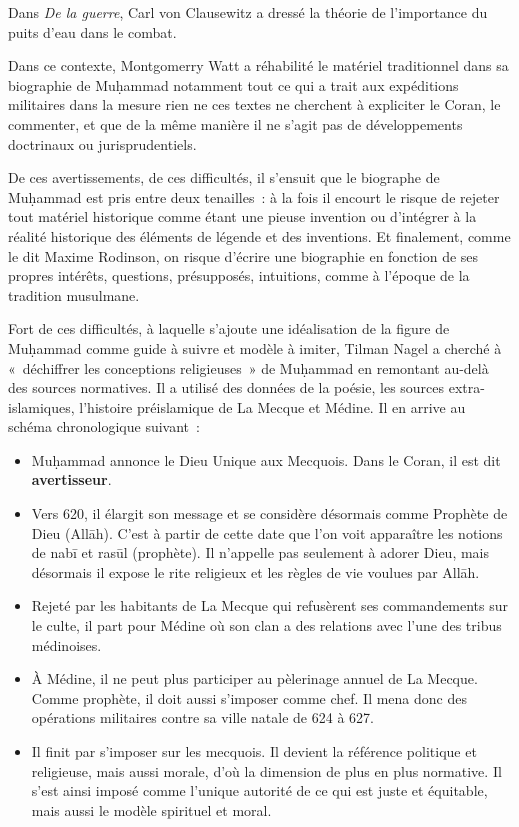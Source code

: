 Dans\textit{ De la guerre}, Carl von Clausewitz a dressé la théorie de
l'importance du puits d'eau dans le combat.

Dans ce contexte, Montgomerry Watt a réhabilité le matériel traditionnel
dans sa biographie de Muḥammad notamment tout ce qui a trait aux
expéditions militaires dans la mesure rien ne ces textes ne cherchent à
expliciter le Coran, le commenter, et que de la même manière il ne
s'agit pas de développements doctrinaux ou jurisprudentiels.

De ces avertissements, de ces difficultés, il s'ensuit que le biographe
de Muḥammad est pris entre deux tenailles~: à la fois il encourt le
risque de rejeter tout matériel historique comme étant une pieuse
invention ou d'intégrer à la réalité historique des éléments de légende
et des inventions. Et finalement, comme le dit Maxime Rodinson, on
risque d'écrire une biographie en fonction de ses propres intérêts,
questions, présupposés, intuitions, comme à l'époque de la tradition
musulmane.

Fort de ces difficultés, à laquelle s'ajoute une idéalisation de la
figure de Muḥammad comme guide à suivre et modèle à imiter, Tilman Nagel
a cherché à «~déchiffrer les conceptions religieuses~» de Muḥammad en
remontant au-delà des sources normatives. Il a utilisé des données de la
poésie, les sources extra-islamiques, l'histoire préislamique de La
Mecque et Médine. Il en arrive au schéma chronologique suivant~:

\begin{itemize}
\item
  Muḥammad annonce le Dieu Unique aux Mecquois. Dans le Coran, il est
  dit \textbf{avertisseur}.
\item
  Vers 620, il élargit son message et se considère désormais comme
  Prophète de Dieu (Allāh). C'est à partir de cette date que l'on voit
  apparaître les notions de nabī et rasūl (prophète). Il n'appelle pas
  seulement à adorer Dieu, mais désormais il expose le rite religieux et
  les règles de vie voulues par Allāh.
\item
  Rejeté par les habitants de La Mecque qui refusèrent ses commandements
  sur le culte, il part pour Médine où son clan a des relations avec
  l'une des tribus médinoises.
\item
  À Médine, il ne peut plus participer au pèlerinage annuel de La
  Mecque. Comme prophète, il doit aussi s'imposer comme chef. Il mena
  donc des opérations militaires contre sa ville natale de 624 à 627.
\item
  Il finit par s'imposer sur les mecquois. Il devient la référence
  politique et religieuse, mais aussi morale, d'où la dimension de plus
  en plus normative. Il s'est ainsi imposé comme l'unique autorité de ce
  qui est juste et équitable, mais aussi le modèle spirituel et moral.
\end{itemize}

